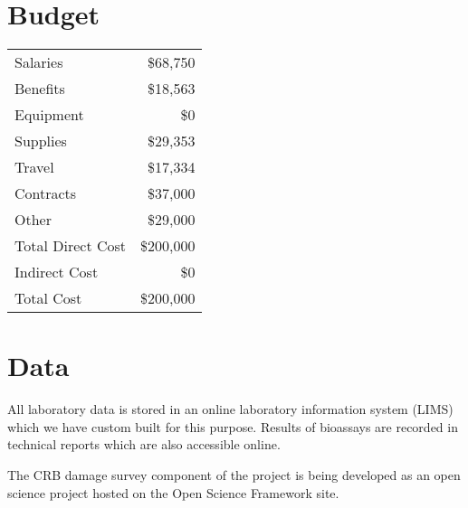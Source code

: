 \documentclass[14pt,english,letterpaper]{scrartcl}
\begin{document}
\section{Budget} 



\begin{tabular}{ lr } 
	\hline
	Salaries          &\$68,750\\
	Benefits          &\$18,563\\ 
	Equipment         &\$0\\ 
	Supplies          &\$29,353\\ 
	Travel            &\$17,334\\ 
	Contracts         &\$37,000\\ 
	Other             &\$29,000\\ 
	\hline
	Total Direct Cost &\$200,000\\ 
	Indirect Cost     &\$0\\ 
	\hline
	Total Cost        &\$200,000\\ 
	\hline
\end{tabular}

\section{Data} 


All laboratory data is stored in an online laboratory information system (LIMS) which we have custom built for this purpose. Results of bioassays are recorded in technical reports which are also accessible online.

The CRB damage survey component of the project is being developed as an open science project hosted on the Open Science Framework site.
\end{document}
